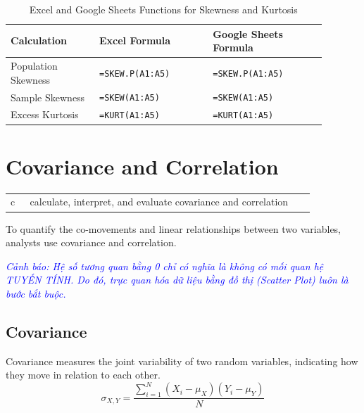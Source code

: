 \begin{table}[!htbp]
\centering
\caption{Excel and Google Sheets Functions for Skewness and Kurtosis}
\label{tab:excel_skew_kurt_m5}
\begin{tabular}{p{0.25\linewidth} | p{0.32\linewidth} | p{0.32\linewidth}}
\toprule
\textbf{Calculation} & \textbf{Excel Formula} & \textbf{Google Sheets Formula} \\
\midrule
Population Skewness & \texttt{=SKEW.P(A1:A5)} & \texttt{=SKEW.P(A1:A5)} \\
Sample Skewness & \texttt{=SKEW(A1:A5)} & \texttt{=SKEW(A1:A5)} \\
Excess Kurtosis & \texttt{=KURT(A1:A5)} & \texttt{=KURT(A1:A5)} \\
\bottomrule
\end{tabular}
\end{table}

\section{Covariance and Correlation}
\label{sec:Covariance and Correlation}
\begin{center}
\begin{tabular}{p{0.06\linewidth} | p{0.88\linewidth}}
	c & calculate, interpret, and evaluate covariance and correlation \\
\end{tabular}
\end{center}

To quantify the co-movements and linear relationships between two variables, analysts use covariance and correlation.

\textcolor{blue}{\textit{Cảnh báo: Hệ số tương quan bằng 0 chỉ có nghĩa là không có mối quan hệ TUYẾN TÍNH. Do đó, trực quan hóa dữ liệu bằng đồ thị (Scatter Plot) luôn là bước bắt buộc.}}

\subsection{Covariance}
	\label{subsec:Covariance}
Covariance measures the joint variability of two random variables, indicating how they move in relation to each other.
\begin{equation}
	\sigma_{X,Y} = \frac{\sum_{i=1}^{N} (X_i - \mu_X)(Y_i - \mu_Y)}{N}
	\label{eq:pop_covariance_m5}
\end{equation}

